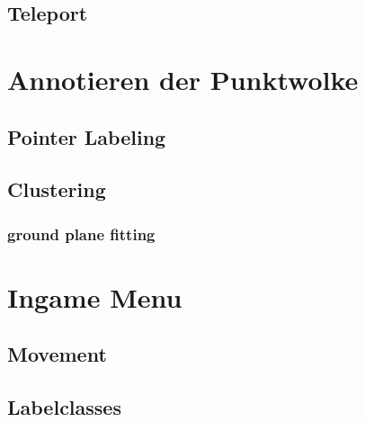 \subsection{Teleport}

\section{Annotieren der Punktwolke}
\label{sec:Annotation}
\subsection{Pointer Labeling}
\subsection{Clustering}
\subsubsection{ground plane fitting}

\section{Ingame Menu}
\label{sec:UIMenu}
\subsection{Movement}
\subsection{Labelclasses}



